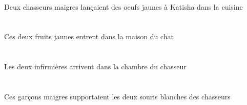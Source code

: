 \begin{exe}
    \DEFSgOblG{}   \cuisineDSgOblG{}   \DANSG{}   \INDDuErgG{}   \maigreCDuG{}   \chasseurCDuErgG{}    \INDSgDatG{}   \KatishaASgDatG{}   \INDPlAbsG{}   \jauneCPlG{}   \oeufCPlAbsG{}  \lancerVdPstCPlG{} \\
 Deux chasseurs maigres lançaient des oeufs jaunes à Katisha dans la cuisine
\ex\glll
   \DEMDuAbs{}   \jauneADu{}   \fruitADuAbs{}    \DEFSgObl{}    \DEFSgObl{}   \chatDSgObl{}   \DE{}   \maisonDSgObl{}   \DANS{}  \entrerViPrsADu{} \\
   \DEMDuAbsP{}   \jauneADuP{}   \fruitADuAbsP{}    \DEFSgOblP{}    \DEFSgOblP{}   \chatDSgOblP{}   \DEP{}   \maisonDSgOblP{}   \DANSP{}  \entrerViPrsADuP{} \\
   \DEMDuAbsG{}   \jauneADuG{}   \fruitADuAbsG{}    \DEFSgOblG{}    \DEFSgOblG{}   \chatDSgOblG{}   \DEG{}   \maisonDSgOblG{}   \DANSG{}  \entrerViPrsADuG{} \\
 Ces deux fruits jaunes entrent dans la maison du chat
\ex\glll
   \DEFDuAbs{}   \infirmiereADuAbs{}    \DEFSgObl{}    \DEFSgObl{}   \chasseurCSgObl{}   \DE{}   \chambreBSgObl{}   \DANS{}  \arriverViPrsADu{} \\
   \DEFDuAbsP{}   \infirmiereADuAbsP{}    \DEFSgOblP{}    \DEFSgOblP{}   \chasseurCSgOblP{}   \DEP{}   \chambreBSgOblP{}   \DANSP{}  \arriverViPrsADuP{} \\
   \DEFDuAbsG{}   \infirmiereADuAbsG{}    \DEFSgOblG{}    \DEFSgOblG{}   \chasseurCSgOblG{}   \DEG{}   \chambreBSgOblG{}   \DANSG{}  \arriverViPrsADuG{} \\
 Les deux infirmières arrivent dans la chambre du chasseur
\ex\glll
   \DEMPlErg{}   \maigreDPl{}   \garconDPlErg{}   \DEFDuAbs{}    \DEFPlObl{}   \chasseurCPlObl{}   \DE{}   \blancBDu{}   \sourisBDuAbs{}  \supporterVtPstBDu{} \\
   \DEMPlErgP{}   \maigreDPlP{}   \garconDPlErgP{}   \DEFDuAbsP{}    \DEFPlOblP{}   \chasseurCPlOblP{}   \DEP{}   \blancBDuP{}   \sourisBDuAbsP{}  \supporterVtPstBDuP{} \\
   \DEMPlErgG{}   \maigreDPlG{}   \garconDPlErgG{}   \DEFDuAbsG{}    \DEFPlOblG{}   \chasseurCPlOblG{}   \DEG{}   \blancBDuG{}   \sourisBDuAbsG{}  \supporterVtPstBDuG{} \\
 Ces garçons maigres supportaient les deux souris blanches des chasseurs
\ex\glll
   \INDDuErg{}   \infirmiereADuErg{}    \INDDuDat{}   \chatDDuDat{}   \INDSgAbs{}   \litDSgAbs{}  \montrerVdPstDSg{} \\
   \INDDuErgP{}   \infirmiereADuErgP{}    \INDDuDatP{}   \chatDDuDatP{}   \INDSgAbsP{}   \litDSgAbsP{}  \montrerVdPstDSgP{} \\

\end{exe}
